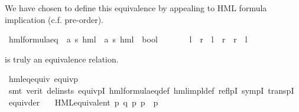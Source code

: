 \begin{isabellebody}
\begin{isamarkuptext}
We have chosen to define this equivalence by appealing to HML formula implication (c.f. pre-order).%
\end{isamarkuptext}\isamarkuptrue%
\isamarkupfalse%
\ hml{\isacharunderscore}{\kern0pt}formula{\isacharunderscore}{\kern0pt}eq\ {\isacharcolon}{\kern0pt}{\isacharcolon}{\kern0pt}\ {\isachardoublequoteopen}{\isacharparenleft}{\kern0pt}{\isacharprime}{\kern0pt}a{\isacharcomma}{\kern0pt}\ {\isacharprime}{\kern0pt}s{\isacharparenright}{\kern0pt}\ hml\ {\isasymRightarrow}\ {\isacharparenleft}{\kern0pt}{\isacharprime}{\kern0pt}a{\isacharcomma}{\kern0pt}\ {\isacharprime}{\kern0pt}s{\isacharparenright}{\kern0pt}\ hml\ {\isasymRightarrow}\ bool{\isachardoublequoteclose}\ {\isacharparenleft}{\kern0pt}\ {\isachardoublequoteopen}{\isasymLleftarrow}{\isasymRrightarrow}{\isachardoublequoteclose}\ {}{}{\isacharparenright}{\kern0pt}\ \ \isanewline
\ \ {\isachardoublequoteopen}{\isasymphi}l\ {\isasymLleftarrow}{\isasymRrightarrow}\ {\isasymphi}r\ {\isasymequiv}\ {\isasymphi}l\ {\isasymRrightarrow}\ {\isasymphi}r\ {\isasymand}\ {\isasymphi}r\ {\isasymRrightarrow}\ {\isasymphi}l{\isachardoublequoteclose}%
\begin{isamarkuptext}%
\isa{{\isasymLleftarrow}{\isasymRrightarrow}} is truly an equivalence relation.%
\end{isamarkuptext}\isamarkuptrue%
\isamarkupfalse%
\ hml{\isacharunderscore}{\kern0pt}eq{\isacharunderscore}{\kern0pt}equiv{\isacharcolon}{\kern0pt}\ {\isachardoublequoteopen}equivp\ {\isacharparenleft}{\kern0pt}{\isasymLleftarrow}{\isasymRrightarrow}{\isacharparenright}{\kern0pt}{\isachardoublequoteclose}\isanewline
%
\isadelimproof
\ \ %
\endisadelimproof
%
\isatagproof
{}\isamarkupfalse%
\ {\isacharparenleft}{\kern0pt}smt\ {\isacharparenleft}{\kern0pt}verit{\isacharcomma}{\kern0pt}\ del{\isacharunderscore}{\kern0pt}insts{\isacharparenright}{\kern0pt}\ equivpI\ hml{\isacharunderscore}{\kern0pt}formula{\isacharunderscore}{\kern0pt}eq{\isacharunderscore}{\kern0pt}def\ hml{\isacharunderscore}{\kern0pt}impl{\isacharunderscore}{\kern0pt}def\ reflpI\ sympI\ transpI{\isacharparenright}{\kern0pt}%
\endisatagproof
{\isafoldproof}%
%
\isadelimproof
\isanewline
%
\endisadelimproof
\isanewline
{}\isamarkupfalse%
\ equiv{\isacharunderscore}{\kern0pt}der{\isacharcolon}{\kern0pt}\isanewline
\ \ \ {\isachardoublequoteopen}HML{\isacharunderscore}{\kern0pt}equivalent\ p\ q{\isachardoublequoteclose}\ {\isachardoublequoteopen}{\isasymexists}p{\isacharprime}{\kern0pt}{\isachardot}{\kern0pt}\ p\ {\isasymmapsto}{\isasymalpha}\ p{\isacharprime}{\kern0pt}{\isachardoublequoteclose}\isanewline

\end{isabellebody}
